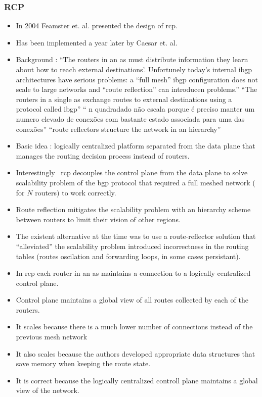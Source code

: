 \documentclass[12pt,openright,twoside]{report}
\begin{document}
\subsubsection{RCP}
\begin{itemize}
\item  In 2004 Feamster et. al.  \cite{Feamster:2004tg}   presented the design of \gls{rcp}.
\item  Has been implemented a year later by Caesar et. al.  \cite{Caesar:2005wsa}

\item Background : ``The routers in an \gls{as} must distribute information they learn about how to reach external destinations'. Unfortunely today's internal \gls{ibgp} architectures have serious problems: a ``full mesh'' \gls{ibgp} configuration does not scale to large networks and ``route reflection'' can introducen problems.'' ``The routers in a single \gls{as} exchange routes to external destinations using a protocol called \gls{ibgp}'' `` n quadradado não escala porque é preciso manter um numero elevado de conexões com bastante estado associada para uma das conexões'' ``route reflectors structure the network in an hierarchy''

\item Basic idea : logically centralized platform separated from the data plane that manages the routing decision process instead of routers. 
\item Interestingly ~\gls{rcp} decouples the control plane from the data plane to solve scalability problem of the \gls{bgp} protocol that required a full meshed network ( for $N$ routers)   to work correctly. 
\item Route reflection mitigates the scalability problem  with an hierarchy scheme between routers to limit their vision of other regions. 

\item The existent alternative at the time was to use a route-reflector solution that ``alleviated'' the  scalability problem introduced incorrectness in the routing tables (routes oscilation and forwarding loops, in some cases persistant). 

\item In \gls{rcp} each router in an \gls{as}  maintains a connection to a logically centralized control plane. 
\item Control plane maintains a global view of all routes collected by each of the routers.
\item It scales because there is a much lower number of connections instead of the previous mesh network
\item It also scales because the authors developed appropriate data structures that save memory when keeping the route state. 
\item It is correct because the logically centralized controll plane maintains a global view of the network.



\end{itemize}
\end{document}
